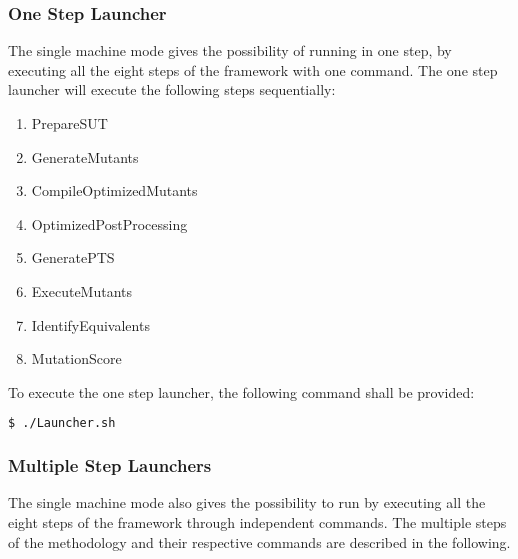 \subsubsection{One Step Launcher}

The single machine mode gives the possibility of running \MASS in one step, by executing all the eight steps of the framework with one command. The one step launcher will execute the following steps sequentially:

\begin{enumerate}
	\item PrepareSUT
	\item GenerateMutants
	\item CompileOptimizedMutants
	\item OptimizedPostProcessing
	\item GeneratePTS
	\item ExecuteMutants
	\item IdentifyEquivalents
	\item MutationScore
\end{enumerate}

To execute the one step launcher, the following command shall be provided:

\begin{lstlisting}[language=bash]
  $ ./Launcher.sh
\end{lstlisting}

\subsubsection{Multiple Step Launchers}
\label{sec:launchers}

The single machine mode also gives the possibility to run \MASS by executing all the eight steps of the framework through independent commands.
The multiple steps of the methodology and their respective commands are described in the following.

